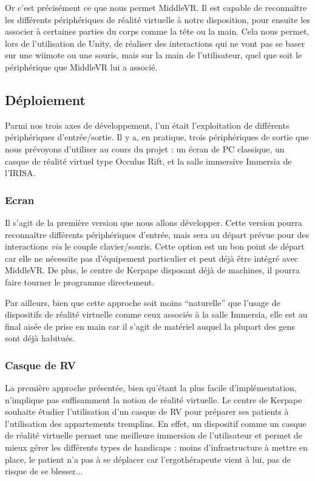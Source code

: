 Or c'est précisément ce que nous permet MiddleVR. Il est capable de reconnaître les différents périphériques de réalité virtuelle à notre disposition, pour ensuite les associer à certaines parties du corps comme la tête ou la main. Cela nous permet, lors de l'utilisation de Unity, de réaliser des interactions qui ne vont pas se  baser sur une wiimote ou une souris, mais sur la main de l'utilisateur, quel que soit le périphérique que MiddleVR lui a associé. 

\subsection{Déploiement}
Parmi nos trois axes de développement, l'un était l'exploitation de différents périphériques d'entrée/sortie. Il y a, en pratique, trois périphériques de sortie que nous prévoyons d'utiliser au cours du projet : un écran de PC classique, un casque de réalité virtuel type Occulus Rift, et la salle immersive Immersia de l'IRISA.

\subsubsection{Ecran}
Il s'agit de la première version que nous allons développer. Cette version pourra reconnaître différents périphériques d'entrée, mais sera au départ prévue pour des interactions \textit{via} le couple clavier/souris. Cette option est un bon point de départ car elle ne nécessite pas d'équipement particulier et peut déjà être intégré avec MiddleVR. De plus, le centre de Kerpape disposant déjà de machines, il pourra faire tourner le programme directement.

Par ailleurs, bien que cette approche soit moins \enquote{naturelle} que l'usage de dispositifs de réalité virtuelle comme ceux associés à la salle Immersia, elle est au final aisée de prise en main car il s'agit de matériel auquel la plupart des gens sont déjà habitués.

\subsubsection{Casque de RV}
La première approche présentée, bien qu'étant la plus facile d’implémentation, n'implique pas suffisamment la notion de réalité virtuelle. Le centre de Kerpape souhaite étudier l'utilisation d'un casque de RV pour préparer ses patients à l’utilisation des appartements tremplins. 
En effet, un dispositif comme un casque de réalité virtuelle permet une meilleure immersion de l'utilisateur et permet de mieux gérer les différents types de handicaps : moins d'infrastructure à mettre en place, le patient n'a pas à se déplacer car l'ergothérapeute vient à lui, pas de risque de se blesser...

